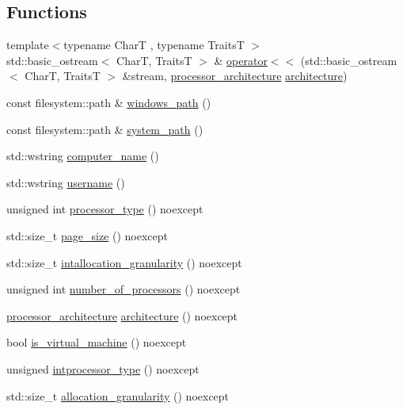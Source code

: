 \subsection*{Functions}
\begin{DoxyCompactItemize}
\item 
{\footnotesize template$<$typename CharT , typename TraitsT $>$ }\\std\+::basic\+\_\+ostream$<$ CharT, TraitsT $>$ \& \mbox{\hyperlink{namespacedistant_1_1system_acbe303e89557abad01810a9e4bf99584}{operator$<$$<$}} (std\+::basic\+\_\+ostream$<$ CharT, TraitsT $>$ \&stream, \mbox{\hyperlink{namespacedistant_1_1system_aabfc7b1c055c49cfbb199db3374aaddd}{processor\+\_\+architecture}} \mbox{\hyperlink{namespacedistant_1_1system_a209898187bb0a320e9c0142efda3c2d0}{architecture}})
\item 
const filesystem\+::path \& \mbox{\hyperlink{namespacedistant_1_1system_a82d95b97c483201de79899ea1f275229}{windows\+\_\+path}} ()
\item 
const filesystem\+::path \& \mbox{\hyperlink{namespacedistant_1_1system_a6061abc8a9c3e2661ce0b36af1c5a608}{system\+\_\+path}} ()
\item 
std\+::wstring \mbox{\hyperlink{namespacedistant_1_1system_a53ea9d62e069aa3a567b42058339a3f6}{computer\+\_\+name}} ()
\item 
std\+::wstring \mbox{\hyperlink{namespacedistant_1_1system_a8fd896d3dc521a84091484ebec0bf54d}{username}} ()
\item 
unsigned int \mbox{\hyperlink{namespacedistant_1_1system_a65aaebc0d3b927589c56cbdc57d44d3f}{processor\+\_\+type}} () noexcept
\item 
std\+::size\+\_\+t \mbox{\hyperlink{namespacedistant_1_1system_a7669b2fad6cd394972ab6d4fe1b16648}{page\+\_\+size}} () noexcept
\item 
std\+::size\+\_\+t \mbox{\hyperlink{namespacedistant_1_1system_a1a71d4fb7d23c6a1cdbe0539b99b44bd}{intallocation\+\_\+granularity}} () noexcept
\item 
unsigned int \mbox{\hyperlink{namespacedistant_1_1system_a26d7199995112f124f3cbfe7167f9949}{number\+\_\+of\+\_\+processors}} () noexcept
\item 
\mbox{\hyperlink{namespacedistant_1_1system_aabfc7b1c055c49cfbb199db3374aaddd}{processor\+\_\+architecture}} \mbox{\hyperlink{namespacedistant_1_1system_a209898187bb0a320e9c0142efda3c2d0}{architecture}} () noexcept
\item 
bool \mbox{\hyperlink{namespacedistant_1_1system_a08a7f5da4813bfc91bafd1828b94bcb3}{is\+\_\+virtual\+\_\+machine}} () noexcept
\item 
unsigned \mbox{\hyperlink{namespacedistant_1_1system_a832a78405d3b787142e1584a05edfb7d}{intprocessor\+\_\+type}} () noexcept
\item 
std\+::size\+\_\+t \mbox{\hyperlink{namespacedistant_1_1system_a6a648bdde5b955cbce9d820ebf5d1542}{allocation\+\_\+granularity}} () noexcept
\end{DoxyCompactItemize}


